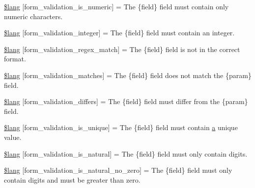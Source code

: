 \begin{DoxyCompactItemize}
\item 
\hyperlink{system_2language_2english_2form__validation__lang_8php_a520425fb2cba1854c9df71d98f5645c3}{\$lang} \mbox{[}\textquotesingle{}form\+\_\+validation\+\_\+is\+\_\+numeric\textquotesingle{}\mbox{]} = \textquotesingle{}The \{field\} field must contain only numeric characters.\textquotesingle{}
\item 
\hyperlink{system_2language_2english_2form__validation__lang_8php_a4253ed0257e1c783da5b45a932b473ba}{\$lang} \mbox{[}\textquotesingle{}form\+\_\+validation\+\_\+integer\textquotesingle{}\mbox{]} = \textquotesingle{}The \{field\} field must contain an integer.\textquotesingle{}
\item 
\hyperlink{system_2language_2english_2form__validation__lang_8php_a3642194a4f8f60f9588a66d6b2096755}{\$lang} \mbox{[}\textquotesingle{}form\+\_\+validation\+\_\+regex\+\_\+match\textquotesingle{}\mbox{]} = \textquotesingle{}The \{field\} field is not in the correct format.\textquotesingle{}
\item 
\hyperlink{system_2language_2english_2form__validation__lang_8php_acdae85274ab41f354dc69117ff100389}{\$lang} \mbox{[}\textquotesingle{}form\+\_\+validation\+\_\+matches\textquotesingle{}\mbox{]} = \textquotesingle{}The \{field\} field does not match the \{param\} field.\textquotesingle{}
\item 
\hyperlink{system_2language_2english_2form__validation__lang_8php_a2df815034671ae2aae09c5d8697d8ebf}{\$lang} \mbox{[}\textquotesingle{}form\+\_\+validation\+\_\+differs\textquotesingle{}\mbox{]} = \textquotesingle{}The \{field\} field must differ from the \{param\} field.\textquotesingle{}
\item 
\hyperlink{system_2language_2english_2form__validation__lang_8php_ae450f8ce514e6c43b78599c8535c1647}{\$lang} \mbox{[}\textquotesingle{}form\+\_\+validation\+\_\+is\+\_\+unique\textquotesingle{}\mbox{]} = \textquotesingle{}The \{field\} field must contain \hyperlink{_admin_2assets_2js_2bootstrap_8min_8js_a1f5870dcf487187f13d5fd328ed9e6e7}{a} unique value.\textquotesingle{}
\item 
\hyperlink{system_2language_2english_2form__validation__lang_8php_a10a669b7755f5eb6c4c0b5d8ad7af449}{\$lang} \mbox{[}\textquotesingle{}form\+\_\+validation\+\_\+is\+\_\+natural\textquotesingle{}\mbox{]} = \textquotesingle{}The \{field\} field must only contain digits.\textquotesingle{}
\item 
\hyperlink{system_2language_2english_2form__validation__lang_8php_a9cd7170707b93d47702698ff85d7ab9c}{\$lang} \mbox{[}\textquotesingle{}form\+\_\+validation\+\_\+is\+\_\+natural\+\_\+no\+\_\+zero\textquotesingle{}\mbox{]} = \textquotesingle{}The \{field\} field must only contain digits and must be greater than zero.\textquotesingle{}

\end{DoxyCompactItemize}
